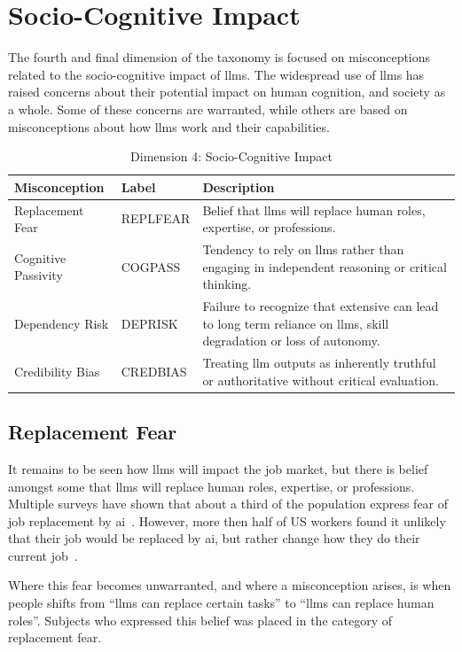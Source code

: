 \section{Socio-Cognitive Impact}
The fourth and final dimension of the taxonomy is focused on misconceptions related to the socio-cognitive impact of \gls{llms}. The widespread use of \gls{llms} has raised concerns about their potential impact on human cognition, and society as a whole. Some of these concerns are warranted, while others are based on misconceptions about how \gls{llms} work and their capabilities.

\begin{table}[htbp]
\centering
\caption{Dimension 4: Socio-Cognitive Impact}\label{dim4}
\begin{tabularx}{\textwidth}{|l|l|X|}
\hline
\textbf{Misconception} & \textbf{Label} & \textbf{Description} \\
\hline
Replacement Fear & REPLFEAR & Belief that \gls{llms} will replace human roles, expertise, or professions. \\
\hline
Cognitive Passivity & COGPASS & Tendency to rely on \gls{llms} rather than engaging in independent reasoning or critical thinking. \\
\hline
Dependency Risk & DEPRISK & Failure to recognize that extensive can lead to long term reliance on \gls{llms}, skill degradation or loss of autonomy. \\
\hline
Credibility Bias & CREDBIAS & Treating \gls{llm} outputs as inherently truthful or authoritative without critical evaluation. \\
\hline
\end{tabularx}
\end{table}

\subsection{Replacement Fear}\label{replfear}
It remains to be seen how \gls{llms} will impact the job market, but there is belief amongst some that \gls{llms} will replace human roles, expertise, or professions. Multiple surveys have shown that about a third of the population express fear of job replacement by \gls{ai}\ \cite{chhibber_will_2025,lin_us_2025}. However, more then half of US workers found it unlikely that their job would be replaced by \gls{ai}, but rather change how they do their current job\ \cite{lin_us_2025}.

Where this fear becomes unwarranted, and where a misconception arises, is when people shifts from ``\gls{llms} can replace certain tasks'' to ``\gls{llms} can replace human roles''. Subjects who expressed this belief was placed in the category of replacement fear. 

